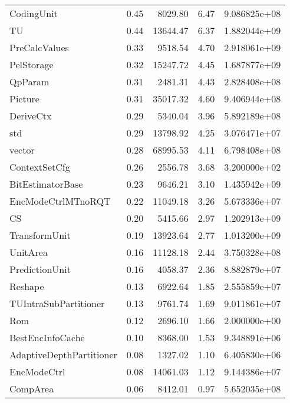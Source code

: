 \begin{tabular}{lrrrr}
CodingUnit                &   0.45 &   8029.80 &      6.47 &  9.086825e+08 \\
TU                        &   0.44 &  13644.47 &      6.37 &  1.882044e+09 \\
PreCalcValues             &   0.33 &   9518.54 &      4.70 &  2.918061e+09 \\
PelStorage                &   0.32 &  15247.72 &      4.45 &  1.687877e+09 \\
QpParam                   &   0.31 &   2481.31 &      4.43 &  2.828408e+08 \\
Picture                   &   0.31 &  35017.32 &      4.60 &  9.406944e+08 \\
DeriveCtx                 &   0.29 &   5340.04 &      3.96 &  5.892189e+08 \\
std                       &   0.29 &  13798.92 &      4.25 &  3.076471e+07 \\
vector                    &   0.28 &  68995.53 &      4.11 &  6.798408e+08 \\
ContextSetCfg             &   0.26 &   2556.78 &      3.68 &  3.200000e+02 \\
BitEstimatorBase          &   0.23 &   9646.21 &      3.10 &  1.435942e+09 \\
EncModeCtrlMTnoRQT        &   0.22 &  11049.18 &      3.26 &  5.673336e+07 \\
CS                        &   0.20 &   5415.66 &      2.97 &  1.202913e+09 \\
TransformUnit             &   0.19 &  13923.64 &      2.77 &  1.013200e+09 \\
UnitArea                  &   0.16 &  11128.18 &      2.44 &  3.750328e+08 \\
PredictionUnit            &   0.16 &   4058.37 &      2.36 &  8.882879e+07 \\
Reshape                   &   0.13 &   6922.64 &      1.85 &  2.555859e+07 \\
TUIntraSubPartitioner     &   0.13 &   9761.74 &      1.69 &  9.011861e+07 \\
Rom                       &   0.12 &   2696.10 &      1.66 &  2.000000e+00 \\
BestEncInfoCache          &   0.10 &   8368.00 &      1.53 &  9.348891e+06 \\
AdaptiveDepthPartitioner  &   0.08 &   1327.02 &      1.10 &  6.405830e+06 \\
EncModeCtrl               &   0.08 &  14061.03 &      1.12 &  9.144386e+07 \\
CompArea                  &   0.06 &   8412.01 &      0.97 &  5.652035e+08 \\

\end{tabular}
